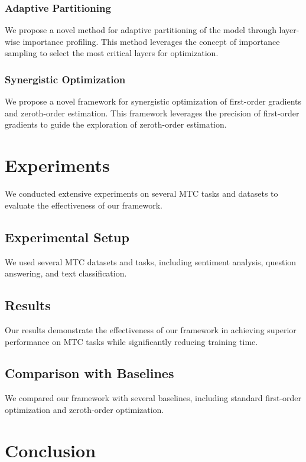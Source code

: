 \documentclass[12pt]{article}
\begin{document}
\subsubsection{Adaptive Partitioning}

We propose a novel method for adaptive partitioning of the model through layer-wise importance profiling. This method leverages the concept of importance sampling to select the most critical layers for optimization.

\subsubsection{Synergistic Optimization}

We propose a novel framework for synergistic optimization of first-order gradients and zeroth-order estimation. This framework leverages the precision of first-order gradients to guide the exploration of zeroth-order estimation.

\section{Experiments}

We conducted extensive experiments on several MTC tasks and datasets to evaluate the effectiveness of our framework.

\subsection{Experimental Setup}

We used several MTC datasets and tasks, including sentiment analysis, question answering, and text classification.

\subsection{Results}

Our results demonstrate the effectiveness of our framework in achieving superior performance on MTC tasks while significantly reducing training time.

\subsection{Comparison with Baselines}

We compared our framework with several baselines, including standard first-order optimization and zeroth-order optimization.

\section{Conclusion}
\end{document}

